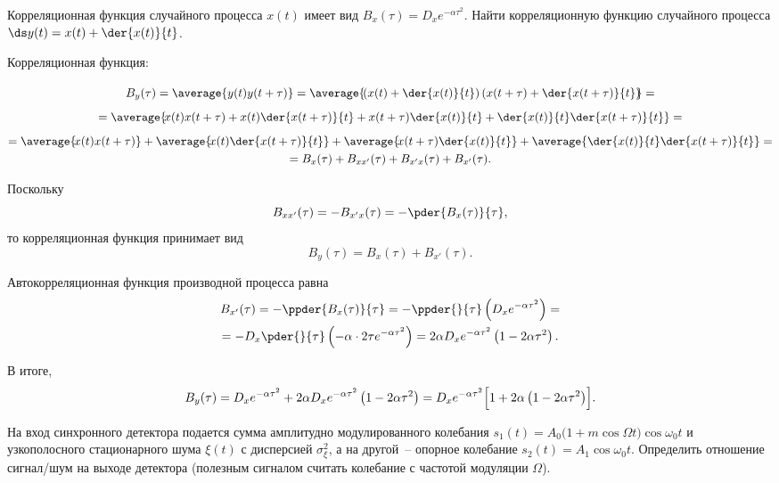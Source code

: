 \documentclass[pscyr]{hedwork}
\newcommand{\nst}{\rule{0pt}{3.0ex}}
\newcommand{\bst}{\rule{0pt}{3.5ex}}
\begin{document}
  \begin{task}{37}{
    Корреляционная функция случайного процесса \( x(t) \) имеет вид
    \( B_x(\tau) = D_x e^{-\alpha\tau^2} \). Найти корреляционную функцию
    случайного процесса \( \ds y(t) = x(t) + \der{x(t)}{t} \).
  }
  
    Корреляционная функция:
    \begin{gather*}
      B_y(\tau) = \average{\strut y(t)y(t+\tau)} =
        \average{\!\!\bst\left(x(t) + \der{x(t)}{t}\right)
        \left(x(t + \tau) + \der{x(t+\tau)}{t}\right)\!\!} = \\
      = \average{\!\nst x(t)x(t+\tau) + x(t)\der{x(t+\tau)}{t} +
        x(t+\tau)\der{x(t)}{t} + \der{x(t)}{t}\der{x(t+\tau)}{t}} = \\
      = \average{\!\nst x(t)x(t+\tau)} + \average{\! x(t)\der{x(t+\tau)}{t}} +
        \average{\! x(t+\tau)\der{x(t)}{t}} +
        \average{\der{x(t)}{t}\der{x(t+\tau)}{t}} = \\
      = B_x(\tau) + B_{xx'}(\tau) + B_{x'x}(\tau) + B_{x'}(\tau).
    \end{gather*}
    
    Поскольку
    \[
      B_{xx'}(\tau) = -B_{x'x}(\tau) = -\pder{B_x(\tau)}{\tau},
    \]
    то корреляционная функция принимает вид
    \[
      B_y(\tau) = B_x(\tau) + B_{x'}(\tau).
    \]
    
    Автокорреляционная функция производной процесса равна
    \begin{gather*}
      B_{x'}(\tau) = -\ppder{B_x(\tau)}{\tau} = -\ppder{}{\tau}\left(
        D_x e^{-\alpha\tau^2} \right) = \\
      = -D_x\pder{}{\tau}\left(-\alpha\cdot 2\tau e^{-\alpha\tau^2}\right) =
        2\alpha D_x e^{-\alpha\tau^2}\left(1 - 2\alpha\tau^2\right).
    \end{gather*}
    
    В итоге,
    \[
      B_y(\tau) = D_x e^{-\alpha\tau^2} + 2\alpha D_x e^{-\alpha\tau^2}
        \left(1 - 2\alpha\tau^2\right) = D_x e^{-\alpha\tau^2}
        \Bigl[1 + 2\alpha\left(1 - 2\alpha\tau^2\right)\Bigr].
    \]
  
  \end{task}
  
  \begin{task*}{47}{
    На вход синхронного детектора подается сумма амплитудно модулированного
    колебания \( s_1(t) = A_0 \bigl(1 + m\cos\Omega t\big) \cos\omega_0 t \)
    и узкополосного стационарного шума \( \xi(t) \) с дисперсией
    \( \sigma_\xi^2 \), а на другой~-- опорное колебание
    \( s_2(t) = A_1\cos\omega_0 t \). Определить отношение сигнал/шум на выходе
    детектора (полезным сигналом считать колебание с частотой модуляции
    \( \Omega \)).
  }
  
  \end{task*}
\end{document}
